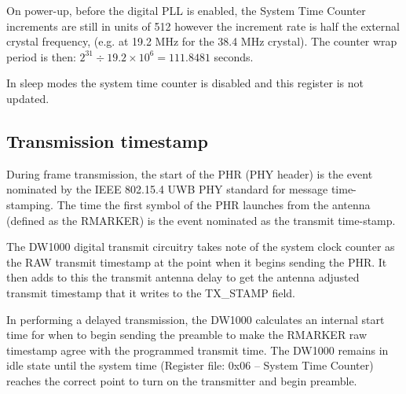 \documentclass[./main.tex]{subfiles}
\begin{document}
On power-up, before the digital PLL is enabled, the System Time Counter increments are still in units of 512 however the increment rate is half the external crystal frequency, (e.g. at 19.2 MHz for the 38.4 MHz crystal). The counter wrap period is then: $2^{31} \div 19.2 \times 10^6 = 111.8481$
seconds.

In sleep modes the system time counter is disabled and this register is not updated.

\subsection{Transmission timestamp}
During frame transmission, the start of the PHR (PHY header) is the event nominated by the IEEE 802.15.4 UWB PHY standard for message time-stamping. The time the first symbol of the PHR launches from the antenna (defined as the RMARKER) is the event nominated as the transmit time-stamp.

The DW1000 digital transmit circuitry takes note of the system clock counter as the RAW transmit timestamp at the point when it begins sending the PHR. It then adds to this the transmit antenna delay to get the antenna adjusted transmit timestamp that it writes to the TX\_STAMP field.

In performing a delayed transmission, the DW1000 calculates an internal start time for when to begin sending the preamble to make the RMARKER raw timestamp agree with the programmed transmit time. The DW1000 remains in idle state until the system time (Register file: 0x06 – System Time Counter) reaches the correct point to turn on the transmitter and begin preamble.
\end{document}
